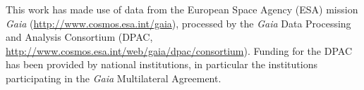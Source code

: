 \documentclass[modern, letterpaper]{aastex61}
\begin{document}
This work has made use of data from the European Space Agency (ESA) mission
{\it Gaia} (\url{http://www.cosmos.esa.int/gaia}), processed by the {\it Gaia}
Data Processing and Analysis Consortium (DPAC,
\url{http://www.cosmos.esa.int/web/gaia/dpac/consortium}). Funding for the DPAC
has been provided by national institutions, in particular the institutions
participating in the {\it Gaia} Multilateral Agreement.



\end{document}
